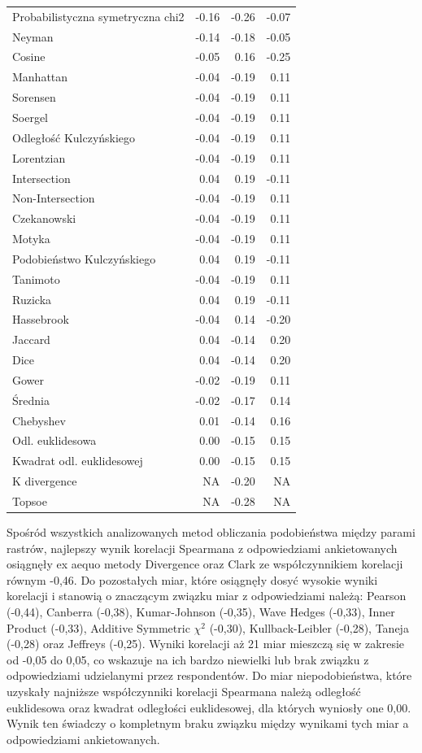 \documentclass{amuthesis}
\begin{document}
\begin{table}
\begin{tabular}{>{\raggedright\arraybackslash}p{4.5cm}rrr}
\addlinespace
Probabilistyczna symetryczna chi2 & -0.16 & -0.26 & -0.07\\
Neyman & -0.14 & -0.18 & -0.05\\
Cosine & -0.05 & 0.16 & -0.25\\
Manhattan & -0.04 & -0.19 & 0.11\\
Sorensen & -0.04 & -0.19 & 0.11\\
\addlinespace
Soergel & -0.04 & -0.19 & 0.11\\
Odległość Kulczyńskiego & -0.04 & -0.19 & 0.11\\
Lorentzian & -0.04 & -0.19 & 0.11\\
Intersection & 0.04 & 0.19 & -0.11\\
Non-Intersection & -0.04 & -0.19 & 0.11\\
\addlinespace
Czekanowski & -0.04 & -0.19 & 0.11\\
Motyka & -0.04 & -0.19 & 0.11\\
Podobieństwo Kulczyńskiego & 0.04 & 0.19 & -0.11\\
Tanimoto & -0.04 & -0.19 & 0.11\\
Ruzicka & 0.04 & 0.19 & -0.11\\
\addlinespace
Hassebrook & -0.04 & 0.14 & -0.20\\
Jaccard & 0.04 & -0.14 & 0.20\\
Dice & 0.04 & -0.14 & 0.20\\
Gower & -0.02 & -0.19 & 0.11\\
Średnia & -0.02 & -0.17 & 0.14\\
\addlinespace
Chebyshev & 0.01 & -0.14 & 0.16\\
Odl. euklidesowa & 0.00 & -0.15 & 0.15\\
Kwadrat odl. euklidesowej & 0.00 & -0.15 & 0.15\\
K divergence & NA & -0.20 & NA\\
Topsoe & NA & -0.28 & NA\\
\bottomrule
\end{tabular}
\end{table}

Spośród wszystkich analizowanych metod obliczania podobieństwa między
parami rastrów, najlepszy wynik korelacji Spearmana z odpowiedziami
ankietowanych osiągnęły ex aequo metody Divergence oraz Clark ze
współczynnikiem korelacji równym -0,46. Do pozostałych miar, które
osiągnęły dosyć wysokie wyniki korelacji i stanowią o znaczącym związku
miar z odpowiedziami należą: Pearson (-0,44), Canberra (-0,38),
Kumar-Johnson (-0,35), Wave Hedges (-0,33), Inner Product (-0,33),
Additive Symmetric \(\chi^2\) (-0,30), Kullback-Leibler (-0,28), Taneja
(-0,28) oraz Jeffreys (-0,25). Wyniki korelacji aż 21 miar mieszczą się
w zakresie od -0,05 do 0,05, co wskazuje na ich bardzo niewielki lub
brak związku z odpowiedziami udzielanymi przez respondentów. Do miar
niepodobieństwa, które uzyskały najniższe współczynniki korelacji
Spearmana należą odległość euklidesowa oraz kwadrat odległości
euklidesowej, dla których wyniosły one 0,00. Wynik ten świadczy o
kompletnym braku związku między wynikami tych miar a odpowiedziami
ankietowanych.
\end{document}
